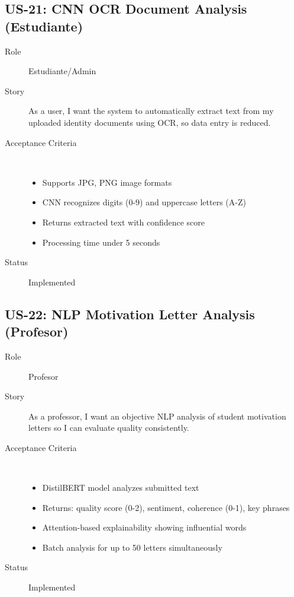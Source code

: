 \documentclass[12pt,a4paper]{report}
\begin{document}
\subsection{US-21: CNN OCR Document Analysis (Estudiante)}
\begin{description}
    \item[Role] Estudiante/Admin
    \item[Story] As a user, I want the system to automatically extract text from my uploaded identity documents using OCR, so data entry is reduced.
    \item[Acceptance Criteria] ~
    \begin{itemize}
        \item Supports JPG, PNG image formats
        \item CNN recognizes digits (0-9) and uppercase letters (A-Z)
        \item Returns extracted text with confidence score
        \item Processing time under 5 seconds
    \end{itemize}
    \item[Status] \textcolor{forestgreen}{\checkmark} Implemented
\end{description}

\subsection{US-22: NLP Motivation Letter Analysis (Profesor)}
\begin{description}
    \item[Role] Profesor
    \item[Story] As a professor, I want an objective NLP analysis of student motivation letters so I can evaluate quality consistently.
    \item[Acceptance Criteria] ~
    \begin{itemize}
        \item DistilBERT model analyzes submitted text
        \item Returns: quality score (0-2), sentiment, coherence (0-1), key phrases
        \item Attention-based explainability showing influential words
        \item Batch analysis for up to 50 letters simultaneously
    \end{itemize}
    \item[Status] \textcolor{forestgreen}{\checkmark} Implemented
\end{description}
\end{document}
